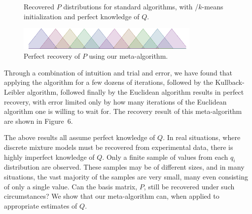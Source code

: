 \documentclass[conference]{IEEEtran}
\begin{document}
\begin{figure}[t]
\begin{center}
\end{center}
\caption{Recovered $P$ distributions for standard  algorithms, with /$k$-means initialization and perfect knowledge of $Q$.}
\end{figure}

\begin{figure}[t]
\begin{center}
\includegraphics[width=3.5in]{synth/Q_nmf}
\end{center}
\vspace{-0.7em}
\caption{Perfect recovery of $P$ using our meta-algorithm.}
\vspace{-1em}
\end{figure}

Through a combination of intuition and trial and error, we have found that applying the  algorithm for a few dozens of iterations, followed by the Kullback-Leibler algorithm, followed finally by the Euclidean algorithm results in perfect recovery, with error limited only by how many iterations of the Euclidean algorithm one is willing to wait for.
The recovery result of this meta-algorithm are shown in Figure~6.

The above results all assume perfect knowledge of $Q$.
In real situations, where discrete mixture models must be recovered from experimental data, there is highly imperfect knowledge of $Q$.
Only a finite sample of values from each $q_i$ distribution are observed.
These samples may be of different sizes, and in many situations, the vast majority of the samples are very small, many even consisting of only a single value.
Can the basis matrix, $P$, still be recovered under such circumstances?
We show that our meta-algorithm can, when applied to appropriate estimates of $Q$.
\end{document}
